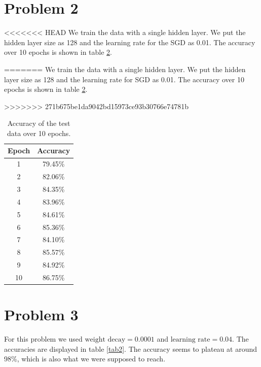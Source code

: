 \documentclass[a4paper]{article}
\begin{document}
\section*{Problem 2}
<<<<<<< HEAD
We train the data with a single hidden layer. We put the hidden layer size as 128 and the learning rate for the SGD as 0.01. The accuracy over 10 epochs is shown in table \ref{tab}.
\begin{table}[h!]
=======
We train the data with a single hidden layer. We put the hidden layer size as 128 and the learning rate for SGD as 0.01. The accuracy over 10 epochs is shown in table \ref{tab}.
\begin{table}[H]
>>>>>>> 271b675be1da9042bd15973ce93b30766e74781b
	\centering
	
	\begin{tabular}{|c|c|}
		\hline
		Epoch & Accuracy \\
		\hline
		1 & 79.45\% \\
		\hline
		2 & 82.06\% \\
		\hline
		3 &  84.35\%\\
		\hline
		4 &  83.96\%\\
		\hline
		5 &  84.61\%\\
		\hline
		6 &  85.36\%\\
		\hline
		7 &  84.10\%\\
		\hline
		8 &  85.57\%\\
		\hline
		9 &  84.92\%\\
		\hline
		10 &  86.75\%\\
		\hline
	\end{tabular}
	\caption{Accuracy of the test data over 10 epochs. }
	\label{tab}
\end{table}

\section*{Problem 3}
For this problem we used $\text{weight decay}  = 0.0001$ and
$\text{learning rate} = 0.04$. The accuracies are displayed in table \ref{tab2}. The accuracy seems to plateau at around 98\%, which is also what we were supposed to reach.


\end{table}
\end{document}
